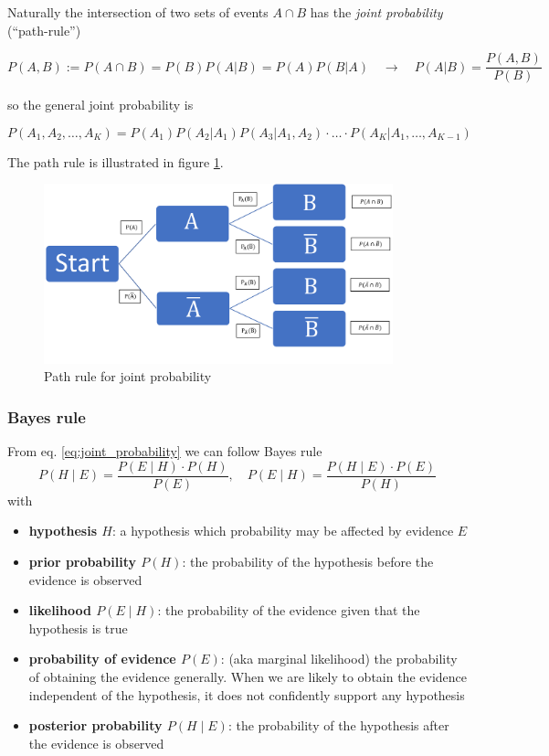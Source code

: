 Naturally the intersection of two sets of events $A \cap B$
has the \textit{joint probability} (\enquote{path-rule})

\begin{equation}
    \label{eq:joint_probability}
    \boxed{P(A,B) := P(A \cap B) = P(B) P(A|B) = P(A) P(B|A) \quad \rightarrow \quad P(A|B) = \frac{P(A,B)}{P(B)}}
\end{equation}

so the general joint probability is

\begin{equation}
    P(A_1,A_2,\dots,A_K) = P(A_1) P(A_2 | A_1) P(A_3|A_1,A_2) \cdot \dots \cdot P(A_K|A_1,\dots,A_{K-1})
\end{equation}

The path rule is illustrated in figure \ref{fig:path_rule}.

\begin{figure}[!htb]
    \centering
    \includegraphics[width=0.9\textwidth]{figures/path_rule.png}
    \caption{Path rule for joint probability}
    \label{fig:path_rule}
\end{figure}

\subsubsection{Bayes rule}
From eq. \ref{eq:joint_probability} we can follow Bayes rule
\begin{equation}
    P(H \mid E)=\frac{P(E \mid H) \cdot P(H)}{P(E)}, \quad P(E \mid H)=\frac{P(H \mid E) \cdot P(E)}{P(H)}
\end{equation}
with
\begin{itemize}
    \item \textbf{hypothesis $H$}: a hypothesis which probability may be affected by evidence $E$
    \item \textbf{prior probability $P(H)$}: the probability of the hypothesis before the evidence is observed
    \item \textbf{likelihood $P(E \mid H)$}: the probability of the evidence given that the hypothesis is true
    \item \textbf{probability of evidence $P(E)$}: (aka marginal likelihood) the probability of obtaining the evidence generally. When we are likely to obtain the evidence independent of the hypothesis, it does not confidently support any hypothesis
    \item \textbf{posterior probability $P(H \mid E)$}: the probability of the hypothesis after the evidence is observed
\end{itemize}

